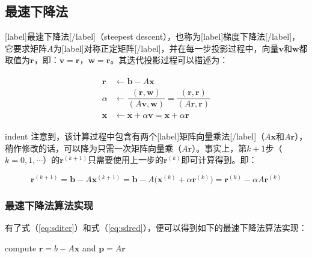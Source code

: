 \documentclass[UTF8,nofonts]{ctexart}
\begin{document}
\subsection*{最速下降法}

[label]最速下降法[/label]（steepest descent），也称为[label]梯度下降法[/label]，它要求矩阵$A$为[label]对称正定矩阵[/label]，并在每一步投影过程中，向量$\boldsymbol{v}$和$\boldsymbol{w}$都取值为$\boldsymbol{r}$，即：$\boldsymbol{v}=\boldsymbol{r}$，$\boldsymbol{w}=\boldsymbol{r}$。其迭代投影过程可以描述为：

\begin{align}
\label{eq:sditer}
\begin{split}
\boldsymbol{r} &\gets \boldsymbol{b}-A\boldsymbol{x} \\
\alpha &\gets \dfrac{(\boldsymbol{r},\boldsymbol{w})}{(A\boldsymbol{v},\boldsymbol{w})}=\dfrac{(\boldsymbol{r},\boldsymbol{r})}{(A\boldsymbol{r},\boldsymbol{r})} \\
\boldsymbol{x} &\gets \boldsymbol{x}+\alpha\boldsymbol{v}=\boldsymbol{x}+\alpha\boldsymbol{r}
\end{split}
\end{align}

indent 注意到，该计算过程中包含有两个[label]矩阵向量乘法[/label]（$A\boldsymbol{x}$和$A\boldsymbol{r}$），稍作修改的话，可以降为只需一次矩阵向量乘（$A\boldsymbol{r}$）。事实上，第$k+1$步（$k=0,1,\cdots$）的$\boldsymbol{r}^{(k+1)}$只需要使用上一步的$\boldsymbol{r}^{(k)}$即可计算得到。即：

\begin{equation}
\label{eq:sdred}
\boldsymbol{r}^{(k+1)}=\boldsymbol{b}-A\boldsymbol{x}^{(k+1)}=\boldsymbol{b}-A\Big(\boldsymbol{x}^{(k)}+\alpha\boldsymbol{r}^{(k)}\Big)=\boldsymbol{r}^{(k)}-\alpha A\boldsymbol{r}^{(k)}
\end{equation}

\subsubsection*{最速下降法算法实现}

有了式（\ref{eq:sditer}）和式（\ref{eq:sdred}），便可以得到如下的最速下降法算法实现：

\begin{algorithm}[H]
compute $\boldsymbol{r}=b-A\boldsymbol{x}$ and $\boldsymbol{p}=A\boldsymbol{r}$\;
\end{algorithm}
\end{document}

